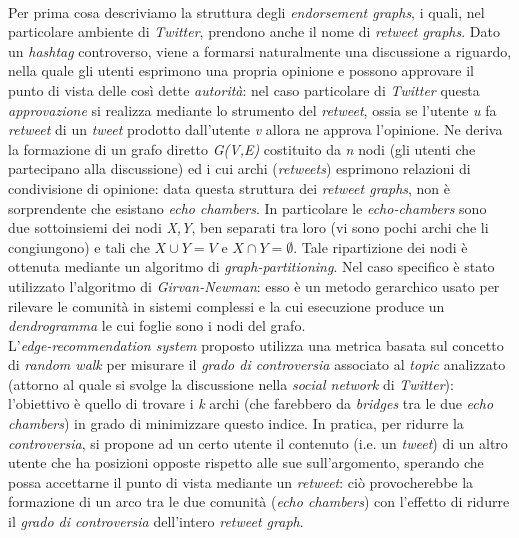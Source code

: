 \\Per prima cosa descriviamo la struttura degli \textit{endorsement graphs}, i quali, nel particolare ambiente di \textit{Twitter}, prendono anche il nome di \textit{retweet graphs}. Dato un \textit{hashtag} controverso, viene a formarsi naturalmente una discussione a riguardo, nella quale gli utenti esprimono una propria opinione e possono approvare il punto di vista delle così dette \textit{autorità}: nel caso particolare di \textit{Twitter} questa \textit{approvazione} si realizza mediante lo strumento del \textit{retweet}, ossia se l'utente \textit{u} fa \textit{retweet} di un \textit{tweet} prodotto dall'utente \textit{v} allora ne approva l'opinione. Ne deriva la formazione di un grafo diretto \textit{G(V,E)} costituito da \textit{n} nodi (gli utenti che partecipano alla discussione) ed i cui archi (\textit{retweets}) esprimono relazioni di condivisione di opinione: data questa struttura dei \textit{retweet graphs}, non è sorprendente che esistano \textit{echo chambers}. In particolare le \textit{echo-chambers} sono due sottoinsiemi dei nodi \textit{X,Y}, ben separati tra loro (vi sono pochi archi che li congiungono) e tali che \textit{$X \cup Y = V$} e \textit{$X \cap Y =  \emptyset$}. Tale ripartizione dei nodi è ottenuta mediante un algoritmo di \textit{graph-partitioning}. Nel caso specifico è stato utilizzato l'algoritmo di \textit{Girvan-Newman}: esso è un metodo gerarchico usato per rilevare le comunità in sistemi complessi e la cui esecuzione produce un \textit{dendrogramma} le cui foglie sono i nodi del grafo.
\\L'\textit{edge-recommendation system} proposto utilizza una metrica basata sul concetto di \textit{random walk} per misurare il \textit{grado di controversia} associato al \textit{topic} analizzato (attorno al quale si svolge la discussione nella \textit{social network} di \textit{Twitter}): l'obiettivo è quello di trovare i \textit{k} archi (che farebbero da \textit{bridges} tra le due \textit{echo chambers}) in grado di minimizzare questo indice. In pratica, per ridurre la \textit{controversia}, si propone ad un certo utente il contenuto (i.e. un \textit{tweet}) di un altro utente che ha posizioni opposte rispetto alle sue sull'argomento, sperando che possa accettarne il punto di vista mediante un \textit{retweet}: ciò provocherebbe la formazione di un arco tra le due comunità (\textit{echo chambers}) con l'effetto di ridurre il \textit{grado di controversia} dell'intero \textit{retweet graph}.  



